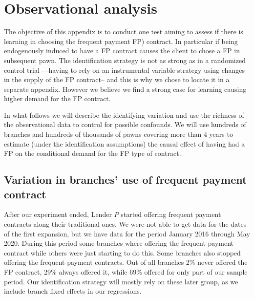 \documentclass[oneside,11pt]{article}
\begin{document}



\newpage
\section{ Observational analysis}
\label{appendix_b}
\vspace{.2in}
\normalsize
\linespread{1.25}


The objective of this appendix is to conduct one test aiming to assess if there is learning in choosing the frequent payment FP) contract. In particular if being endogenously induced to have a FP contract causes the client to chose a FP in subsequent pawn. The identification strategy is not as strong as in a randomized control trial ---having to rely on an instrumental variable strategy using changes in the supply of the FP contract-- and this is why we chose to locate it in a separate appendix. However we believe we find a strong case for learning causing higher demand for the FP contract.

In what follows we will describe the identifying variation and use the richness of the observational data to control for possible confounds. We will use hundreds of branches and hundreds of thousands of pawns covering more than 4 years to estimate (under the identification assumptions) the causal effect of having had a FP on the conditional demand for the FP type of contract.


\vspace{.in}


\subsection{Variation in branches' use of frequent payment contract}

After our experiment ended, Lender $P$ started offering frequent payment contracts along their traditional ones. We were not able to get data for the dates of the first expansion, but we have data for the period January 2016 through May 2020. During this period some branches where offering the frequent payment contract while others were just starting to do this. Some branches also stopped offering the frequent payment contracts. Out of all branches 2\% never offered the FP contract, 29\% always offered it, while 69\% offered for only part of our sample period. Our identification strategy will mostly rely on these later group, as we include branch fixed effects in our regressions. \\
\end{document}
